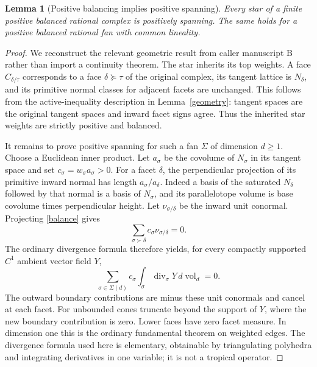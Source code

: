 \documentclass[11pt]{article}
\newtheorem{lemma}[theorem]{Lemma}
\begin{document}
\begin{lemma}[Positive balancing implies positive spanning]\label{balanced}
Every star of a finite positive balanced rational complex is positively spanning. The same holds for a positive balanced rational fan with common lineality.
\end{lemma}
\begin{proof}
We reconstruct the relevant geometric result from caller manuscript B rather than import a continuity theorem. The star inherits its top weights. A face $C_{\delta/\tau}$ corresponds to a face $\delta\succeq\tau$ of the original complex, its tangent lattice is $N_\delta$, and its primitive normal classes for adjacent facets are unchanged. This follows from the active-inequality description in Lemma~\ref{geometry}: tangent spaces are the original tangent spaces and inward facet signs agree. Thus the inherited star weights are strictly positive and balanced.

It remains to prove positive spanning for such a fan $\Sigma$ of dimension $d\geq1$. Choose a Euclidean inner product. Let $a_\sigma$ be the covolume of $N_\sigma$ in its tangent space and set $c_\sigma=w_\sigma a_\sigma>0$. For a facet $\delta$, the perpendicular projection of its primitive inward normal has length $a_\sigma/a_\delta$. Indeed a basis of the saturated $N_\delta$ followed by that normal is a basis of $N_\sigma$, and its parallelotope volume is base covolume times perpendicular height. Let $\nu_{\sigma/\delta}$ be the inward unit conormal. Projecting \eqref{balance} gives
\[\sum_{\sigma\succ\delta}c_\sigma\nu_{\sigma/\delta}=0.\]
The ordinary divergence formula therefore yields, for every compactly supported $C^1$ ambient vector field $Y$,
\begin{equation}\label{stationarity}
 \sum_{\sigma\in\Sigma(d)}c_\sigma\int_\sigma \operatorname{div}_\sigma Y\,d\operatorname{vol}_d=0.
\end{equation}
The outward boundary contributions are minus these unit conormals and cancel at each facet. For unbounded cones truncate beyond the support of $Y$, where the new boundary contribution is zero. Lower faces have zero facet measure. In dimension one this is the ordinary fundamental theorem on weighted edges. The divergence formula used here is elementary, obtainable by triangulating polyhedra and integrating derivatives in one variable; it is not a tropical operator.


\end{proof}
\end{document}
